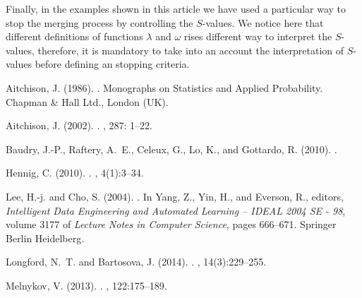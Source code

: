 \documentclass[10pt, a4paper]{article}
\begin{document}
\begin{spacing}{1.9}
Finally, in the examples shown in this article we have used a particular way to stop the merging process by controlling the $S$-values. We notice here that different definitions of functions $\lambda$ and $\omega$ rises different way to interpret the $S$-values, therefore, it is mandatory to take into an account the interpretation of $S$-values before defining an stopping criteria.


\newpage


\begin{thebibliography}{}

Aitchison, J. (1986).
.
\newblock Monographs on Statistics and Applied Probability. Chapman \& Hall
  Ltd., London (UK).

Aitchison, J. (2002).
.
, 287: 1--22.

Baudry, J.-P., Raftery, A.~E., Celeux, G., Lo, K., and Gottardo, R. (2010).
.

Hennig, C. (2010).
.
, 4(1):3--34.

Lee, H.-j. and Cho, S. (2004).
.
\newblock In Yang, Z., Yin, H., and Everson, R., editors, {\em Intelligent Data
  Engineering and Automated Learning – IDEAL 2004 SE - 98}, volume 3177 of
  {\em Lecture Notes in Computer Science}, pages 666--671. Springer Berlin
  Heidelberg.

Longford, N.~T. and Bartosova, J. (2014).
.
, 14(3):229--255.


Melnykov, V. (2013).
.
, 122:175--189.


\end{thebibliography}
\end{spacing}
\end{document}
